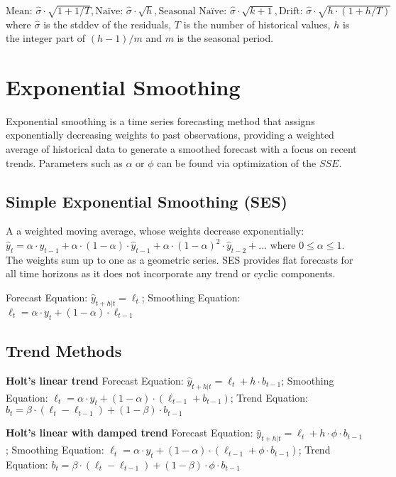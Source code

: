 $ \text{Mean: } \hat{\sigma} \cdot \sqrt{1+1/T}, \text{Naïve: } \hat{\sigma} \cdot \sqrt{h},
\text{Seasonal Naïve: } \hat{\sigma} \cdot \sqrt{k+1}, \text{Drift: } \hat{\sigma} \cdot \sqrt{h \cdot (1+h/T)} $
where $ \hat{\sigma} $ is the stddev of the residuals, $ T $ is the number of historical values, $ h $ is the integer part of $ (h-1)/m $ and $ m $ is the seasonal period.

\section{Exponential Smoothing}
Exponential smoothing is a time series forecasting method that assigns exponentially decreasing weights to past observations,
providing a weighted average of historical data to generate a smoothed forecast with a focus on recent trends.
Parameters such as $ \alpha $ or $ \phi $ can be found via optimization of the $ SSE $.

\subsection{Simple Exponential Smoothing (SES)}
A a weighted moving average, whose weights decrease exponentially:
$ \hat{y}_{t} = \alpha \cdot y_{t-1} + \alpha \cdot (1 - \alpha) \cdot \hat{y}_{t-1} + \alpha \cdot (1 - \alpha)^2 \cdot \hat{y}_{t-2} + ... $
where $ 0 \le \alpha \le 1 $. The weights sum up to one as a geometric series.
SES provides flat forecasts for all time horizons as it does not incorporate any trend or cyclic components.

Forecast Equation: $ \hat{y}_{t+h|t} = \ell_t $;
Smoothing Equation: $ \ell_t = \alpha \cdot y_t + (1 - \alpha) \cdot \ell_{t-1} $

\subsection{Trend Methods}
\textbf{Holt's linear trend}
Forecast Equation: $ \hat{y}_{t+h|t} = \ell_t + h \cdot b_{t-1} $;
Smoothing Equation: $ \ell_t = \alpha \cdot y_t + (1 - \alpha) \cdot (\ell_{t-1} + b_{t-1}) $;
Trend Equation: $ b_t = \beta \cdot (\ell_t - \ell_{t-1}) + (1 - \beta) \cdot b_{t-1} $

\textbf{Holt's linear with damped trend}
Forecast Equation: $ \hat{y}_{t+h|t} = \ell_t + h \cdot \phi \cdot b_{t-1} $;
Smoothing Equation: $ \ell_t = \alpha \cdot y_t + (1 - \alpha) \cdot (\ell_{t-1} + \phi \cdot b_{t-1}) $;
Trend Equation: $ b_t = \beta \cdot (\ell_t - \ell_{t-1}) + (1 - \beta) \cdot \phi \cdot b_{t-1} $

